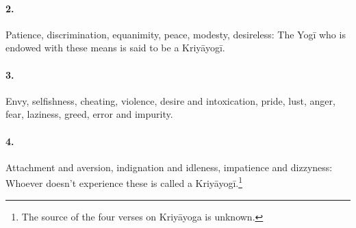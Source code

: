 \begin{otherlanguage}{english}
\begin{tlate}
\paragraph{2.} Patience, discrimination, equanimity, peace, modesty, desireless: The Yogī who is endowed with these means is said to be a Kriyāyogī. 
\paragraph{3.} Envy, selfishness, cheating, violence, desire and intoxication, pride, lust, anger, fear, laziness, greed, error and impurity. 
\paragraph{4.} Attachment and aversion, indignation and idleness, impatience and dizzyness: Whoever doesn't experience these is called a Kriyāyogī.\footnote{The source of the four verses on Kriyāyoga is unknown.} \bigskip \bigskip


\end{tlate}
\end{otherlanguage}
